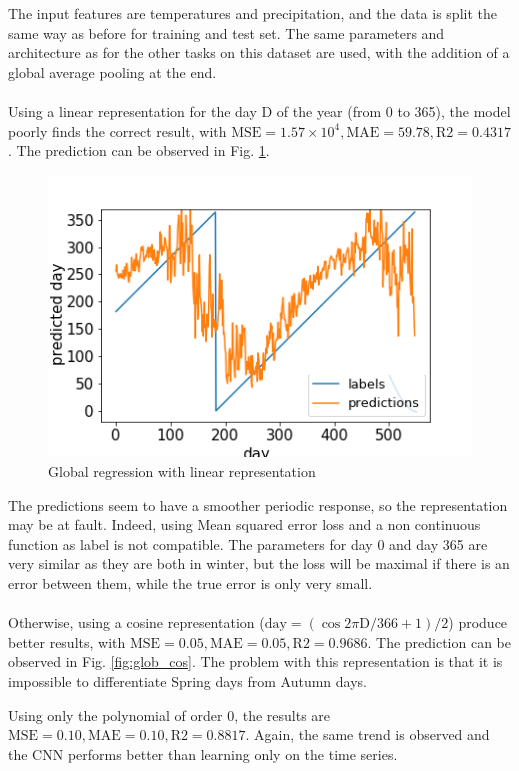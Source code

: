 \documentclass[11pt]{report}
\begin{document}
The input features are temperatures and precipitation, and the data is split the same way as before for training and test set. The same parameters and architecture as for the other tasks on this dataset are used, with the addition of a global average pooling at the end.

\paragraph*{}
Using a linear representation for the day D of the year (from 0 to 365), the model poorly finds the correct result, with $\textrm{MSE} = 1.57\times 10^4, \textrm{MAE} = 59.78, \textrm{R2} = 0.4317$. The prediction can be observed in Fig. \ref{fig:glob_linear}.

\begin{figure}[!ht]
    \centering
    \includegraphics[width=0.5\linewidth]{figures/global_linear_results.png}
    \caption{Global regression with linear representation}
    \label{fig:glob_linear}
\end{figure}

The predictions seem to have a smoother periodic response, so the representation may be at fault. Indeed, using Mean squared error loss and a non continuous function as label is not compatible. The parameters for day 0 and day 365 are very similar as they are both in winter, but the loss will be maximal if there is an error between them, while the true error is only very small.

\paragraph*{}
Otherwise, using a cosine representation ($\textrm{day} = (\cos{2\pi\textrm{D}/366}+1)/2$) produce better results, with $\textrm{MSE} = 0.05, \textrm{MAE} = 0.05, \textrm{R2} = 0.9686$. The prediction can be observed in Fig. \ref{fig:glob_cos}. The problem with this representation is that it is impossible to differentiate Spring days from Autumn days.

Using only the polynomial of order 0, the results are $\textrm{MSE} = 0.10, \textrm{MAE} = 0.10, \textrm{R2} = 0.8817$. Again, the same trend is observed and the CNN performs better than learning only on the time series.
\end{document}
